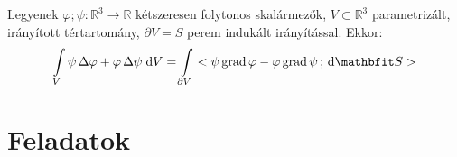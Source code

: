 \documentclass[lang=magyar]{math-handout}
\begin{document}
\begin{theorem}
  Legyenek $\varphi; \psi: \mathbb R^3 \rightarrow \mathbb R$ kétszeresen
  folytonos skalármezők, $V \subset \mathbb R^3$ parametrizált, irányított
  tértartomány, $\partial V = S$ perem indukált irányítással. Ekkor:
  \[
    \int \limits_V
    \psi \, \Delta \varphi + \varphi \, \Delta \psi
    \; \diff V
    =
    \int \limits_{\partial V} \scalar{\psi \grad \varphi - \varphi \grad \psi}{\diff \rvec S}
  \]
\end{theorem}


\section{Feladatok}
\end{document}
